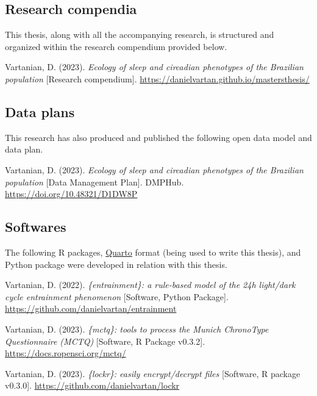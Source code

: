 \documentclass[
12pt,
openright,
oneside,
a4paper,
chapter=TITLE,
section=TITLE,
french,
spanish,
brazil,
english
]{abntex2}\usepackage{array}
\newcommand{\microskip}{\vspace{\microskipamount}}
\begin{document}
\subsection{Research compendia}\label{research-compendia}

This thesis, along with all the accompanying research, is structured and
organized within the research compendium provided below.

\smallskip

\noindent Vartanian, D. (2023). \emph{Ecology of sleep and circadian
phenotypes of the Brazilian population} {[}Research compendium{]}.
\url{https://danielvartan.github.io/mastersthesis/}

\subsection{Data plans}\label{data-plans}

This research has also produced and published the following open data
model and data plan.

\smallskip

\noindent Vartanian, D. (2023). \emph{Ecology of sleep and circadian
phenotypes of the Brazilian population} {[}Data Management Plan{]}.
DMPHub. \url{https://doi.org/10.48321/D1DW8P}

\subsection{Softwares}\label{softwares}

The following R packages, \href{https://quarto.org/}{Quarto} format
(being used to write this thesis), and Python package were developed in
relation with this thesis.

\smallskip

\noindent Vartanian, D. (2022). \emph{\{entrainment\}: a rule-based
model of the 24h light/dark cycle entrainment phenomenon} {[}Software,
Python Package{]}. \url{https://github.com/danielvartan/entrainment}

\microskip

\noindent Vartanian, D. (2023). \emph{\{mctq\}: tools to process the
Munich ChronoType Questionnaire (MCTQ)} {[}Software, R Package
v0.3.2{]}. \url{https://docs.ropensci.org/mctq/}

\microskip

\noindent Vartanian, D. (2023). \emph{\{lockr\}: easily encrypt/decrypt
files} {[}Software, R package v0.3.0{]}.
\url{https://github.com/danielvartan/lockr}
\end{document}
